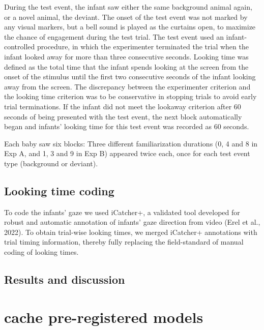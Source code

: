 \documentclass[10pt, letterpaper]{article}
\begin{document}
During the test event, the infant saw either the same background animal
again, or a novel animal, the deviant. The onset of the test event was
not marked by any visual markers, but a bell sound is played as the
curtains open, to maximize the chance of engagement during the test
trial. The test event used an infant-controlled procedure, in which the
experimenter terminated the trial when the infant looked away for more
than three consecutive seconds. Looking time was defined as the total
time that the infant spends looking at the screen from the onset of the
stimulus until the first two consecutive seconds of the infant looking
away from the screen. The discrepancy between the experimenter criterion
and the looking time criterion was to be conservative in stopping trials
to avoid early trial terminations. If the infant did not meet the
lookaway criterion after 60 seconds of being presented with the test
event, the next block automatically began and infants' looking time for
this test event was recorded as 60 seconds.

Each baby saw six blocks: Three different familiarization durations (0,
4 and 8 in Exp A, and 1, 3 and 9 in Exp B) appeared twice each, once for
each test event type (background or deviant).

\hypertarget{looking-time-coding}{%
\subsection{Looking time coding}\label{looking-time-coding}}

To code the infants' gaze we used iCatcher+, a validated tool developed
for robust and automatic annotation of infants' gaze direction from
video (Erel et al., 2022). To obtain trial-wise looking times, we merged
iCatcher+ annotations with trial timing information, thereby fully
replacing the field-standard of manual coding of looking times.

\hypertarget{results-and-discussion-1}{%
\subsection{Results and discussion}\label{results-and-discussion-1}}

\hypertarget{cache-pre-registered-models}{%
\section{cache pre-registered
models}\label{cache-pre-registered-models}}
\end{document}
